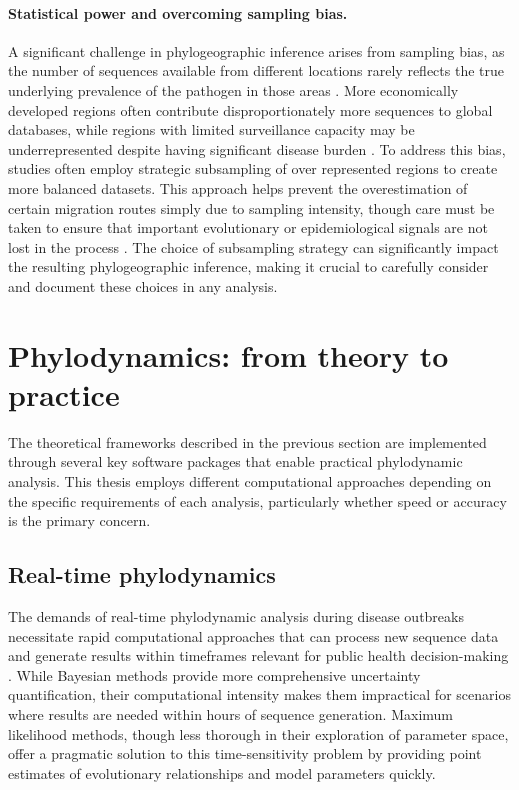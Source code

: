 \paragraph*{Statistical power and overcoming sampling bias.}
A significant challenge in phylogeographic inference arises from sampling bias, as the number of sequences available from different locations rarely reflects the true underlying prevalence of the pathogen in those areas \citep{liu2022impact,layan2023impact}.
More economically developed regions often contribute disproportionately more sequences to global databases, while regions with limited surveillance capacity may be underrepresented despite having significant disease burden \citep{brito2022global}.
To address this bias, studies often employ strategic subsampling of over represented regions to create more balanced datasets.
This approach helps prevent the overestimation of certain migration routes simply due to sampling intensity, though care must be taken to ensure that important evolutionary or epidemiological signals are not lost in the process \citep{magee2018effects}.
The choice of subsampling strategy can significantly impact the resulting phylogeographic inference, making it crucial to carefully consider and document these choices in any analysis.

\section{Phylodynamics: from theory to practice}
The theoretical frameworks described in the previous section are implemented through several key software packages that enable practical phylodynamic analysis.
This thesis employs different computational approaches depending on the specific requirements of each analysis, particularly whether speed or accuracy is the primary concern.

\subsection{Real-time phylodynamics}
The demands of real-time phylodynamic analysis during disease outbreaks necessitate rapid computational approaches that can process new sequence data and generate results within timeframes relevant for public health decision-making \citep{bedford2020cryptic,worobey2020emergence}.
While Bayesian methods provide more comprehensive uncertainty quantification, their computational intensity makes them impractical for scenarios where results are needed within hours of sequence generation.
Maximum likelihood methods, though less thorough in their exploration of parameter space, offer a pragmatic solution to this time-sensitivity problem by providing point estimates of evolutionary relationships and model parameters quickly.

